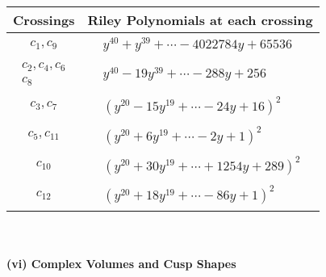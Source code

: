 \documentclass[1p]{elsarticle_modified}
\theoremstyle{definition}
\begin{document}
\begin{tabular}{m{50pt}|m{274pt}}
Crossings & \hspace{64pt}Riley Polynomials at each crossing \\
\hline $$\begin{aligned}c_{1},c_{9}\end{aligned}$$&$\begin{aligned}
&y^{40}+y^{39}+\cdots-4022784 y+65536
\end{aligned}$\\
\hline $$\begin{aligned}c_{2},c_{4},c_{6}\\c_{8}\end{aligned}$$&$\begin{aligned}
&y^{40}-19 y^{39}+\cdots-288 y+256
\end{aligned}$\\
\hline $$\begin{aligned}c_{3},c_{7}\end{aligned}$$&$\begin{aligned}
&(y^{20}-15 y^{19}+\cdots-24 y+16)^{2}
\end{aligned}$\\
\hline $$\begin{aligned}c_{5},c_{11}\end{aligned}$$&$\begin{aligned}
&(y^{20}+6 y^{19}+\cdots-2 y+1)^{2}
\end{aligned}$\\
\hline $$\begin{aligned}c_{10}\end{aligned}$$&$\begin{aligned}
&(y^{20}+30 y^{19}+\cdots+1254 y+289)^{2}
\end{aligned}$\\
\hline $$\begin{aligned}c_{12}\end{aligned}$$&$\begin{aligned}
&(y^{20}+18 y^{19}+\cdots-86 y+1)^{2}
\end{aligned}$\\
\hline
\end{tabular}\\~\\
\newpage\flushleft \textbf{(vi) Complex Volumes and Cusp Shapes}
\end{document}
